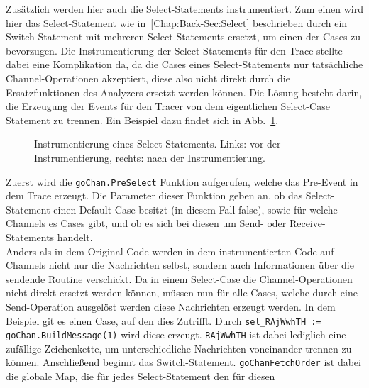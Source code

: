 Zusätzlich werden hier auch die Select-Statements instrumentiert. 
Zum einen wird hier das Select-Statement wie in~\ref{Chap:Back-Sec:Select} 
beschrieben durch ein Switch-Statement mit mehreren Select-Statements 
ersetzt, um einen der Cases zu bevorzugen. 
Die Instrumentierung der Select-Statements für den Trace stellte dabei 
eine Komplikation da, da die Cases eines Select-Statements nur tatsächliche
Channel-Operationen akzeptiert, diese also nicht direkt durch die Ersatzfunktionen 
des Analyzers ersetzt werden können. Die Lösung besteht darin, die 
Erzeugung der Events für den Tracer von dem eigentlichen Select-Case Statement 
zu trennen. Ein Beispiel dazu findet sich in 
Abb.~\ref{Chap:Instrumenter-Sec:Instrumenter-Fig:SelectFull}.
\begin{figure}[h!]
  \begin{minipage}[t]{0.3\textwidth}
    
  \end{minipage}
  \begin{minipage}[t]{0.65\textwidth}
    
  \end{minipage}
  \caption{Instrumentierung eines Select-Statements. Links: vor der 
    Instrumentierung, rechts: nach der Instrumentierung.}
  \label{Chap:Instrumenter-Sec:Instrumenter-Fig:SelectFull}
\end{figure}
Zuerst wird die \texttt{goChan.PreSelect} Funktion aufgerufen, welche das 
Pre-Event in dem Trace erzeugt. Die Parameter dieser Funktion geben an, 
ob das Select-Statement einen Default-Case besitzt (in diesem Fall false),
sowie für welche Channels es Cases gibt, und ob es sich bei diesen 
um Send- oder Receive-Statements handelt.\\
Anders als in dem Original-Code 
werden in dem instrumentierten Code auf Channels nicht nur die Nachrichten selbst, 
sondern auch Informationen über die sendende Routine verschickt. Da in einem 
Select-Case die Channel-Operationen nicht direkt ersetzt werden können, 
müssen nun für alle Cases, welche durch eine Send-Operation ausgelöst werden 
diese Nachrichten erzeugt werden. In dem Beispiel git es einen Case, 
auf den dies Zutrifft. Durch \texttt{sel\_RAjWwhTH := goChan.BuildMessage(1)}
wird diese erzeugt. \texttt{RAjWwhTH} ist dabei lediglich eine zufällige 
Zeichenkette, um unterschiedliche Nachrichten voneinander trennen zu können. 
Anschließend beginnt das Switch-Statement. \texttt{goChanFetchOrder} ist 
dabei die globale Map, die für jedes Select-Statement den für diesen 
